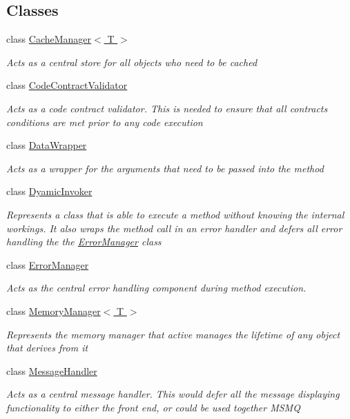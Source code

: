 \subsection*{Classes}
\begin{DoxyCompactItemize}
\item 
class \hyperlink{class_stand_alone_framework_1_1_cache_manager_3_01_t_01_4}{Cache\+Manager$<$ T $>$}
\begin{DoxyCompactList}\small\item\em Acts as a central store for all objects who need to be cached \end{DoxyCompactList}\item 
class \hyperlink{class_stand_alone_framework_1_1_code_contract_validator}{Code\+Contract\+Validator}
\begin{DoxyCompactList}\small\item\em Acts as a code contract validator. This is needed to ensure that all contracts conditions are met prior to any code execution \end{DoxyCompactList}\item 
class \hyperlink{class_stand_alone_framework_1_1_data_wrapper}{Data\+Wrapper}
\begin{DoxyCompactList}\small\item\em Acts as a wrapper for the arguments that need to be passed into the method \end{DoxyCompactList}\item 
class \hyperlink{class_stand_alone_framework_1_1_dyamic_invoker}{Dyamic\+Invoker}
\begin{DoxyCompactList}\small\item\em Represents a class that is able to execute a method without knowing the internal workings. It also wraps the method call in an error handler and defers all error handling the the {\ttfamily \hyperlink{class_stand_alone_framework_1_1_error_manager}{Error\+Manager} class} \end{DoxyCompactList}\item 
class \hyperlink{class_stand_alone_framework_1_1_error_manager}{Error\+Manager}
\begin{DoxyCompactList}\small\item\em Acts as the central error handling component during method execution. \end{DoxyCompactList}\item 
class \hyperlink{class_stand_alone_framework_1_1_memory_manager_3_01_t_01_4}{Memory\+Manager$<$ T $>$}
\begin{DoxyCompactList}\small\item\em Represents the memory manager that active manages the lifetime of any object that derives from it \end{DoxyCompactList}\item 
class \hyperlink{class_stand_alone_framework_1_1_message_handler}{Message\+Handler}
\begin{DoxyCompactList}\small\item\em Acts as a central message handler. This would defer all the message displaying functionality to either the front end, or could be used together M\+S\+M\+Q \end{DoxyCompactList}\end{DoxyCompactItemize}
